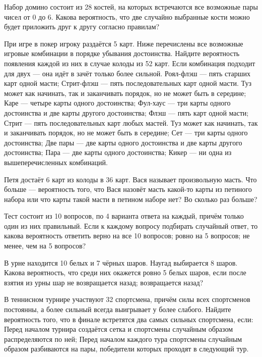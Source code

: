 \documentclass[a4paper,12pt]{article}
\begin{document}
  Набор домино состоит из 28 костей, на которых встречаются все возможные пары чисел от 0 до 6. Какова вероятность, что две случайно выбранные кости можно будет приложить друг к другу согласно правилам?


  При игре в покер игроку раздаётся 5 карт. Ниже перечислены все возможные игровые комбинации в порядке убывания достоинства. Найдите вероятность появления каждой из них в случае колоды из 52 карт. Если комбинация подходит для двух --- она идёт в зачёт только более сильной.
     Роял-флэш --- пять старших карт одной масти;
     Стрит-флэш --- пять последовательных карт одной масти. Туз может как начинать, так и заканчивать порядок, но не может быть в середине;
     Каре --- четыре карты одного достоинства;
     Фул-хаус --- три карты одного достоинства и две карты другого достоинства;
     Флэш --- пять карт одной масти;
     Стрит --- пять последовательных карт любых мастей. Туз может как начинать, так и заканчивать порядок, но не может быть в середине;
     Сет --- три карты одного достоинства;
     Две пары --- две карты одного достоинства и две карты другого достоинства;
     Пара --- две карты одного достоинства;
     Кикер --- ни одна из вышеперечисленных комбинаций.

  Петя достаёт 6 карт из колоды в 36 карт. Вася называет произвольную масть. Что больше --- вероятность того, что Вася назовёт масть какой-то карты из петиного набора или что карты такой масти в петином наборе нет? Во сколько раз больше?

  Тест состоит из 10 вопросов, по 4 варианта ответа на каждый, причём только один из них правильный. Если к каждому вопросу подбирать случайный ответ, то какова вероятность ответить верно  на все 10 вопросов;  ровно на 5 вопросов;  не менее, чем на 5 вопросов?

  В урне находится 10 белых и 7 чёрных шаров. Наугад выбирается 8 шаров. Какова вероятность, что среди них окажется ровно 5 белых шаров, если после взятия из урны шар  не возвращается назад;  возвращается назад?

  В теннисном турнире участвуют 32 спортсмена, причём силы всех спортсменов постоянны, а более сильный всегда выигрывает у более слабого. Найдите вероятность того, что в финале встретятся два самых сильных спортсмена, если:
     Перед началом турнира создаётся сетка и спортсмены случайным образом распределяются по ней;
     Перед началом каждого тура спортсмены случайным образом разбиваются на пары, победители которых проходят в следующий тур.
\end{document}
